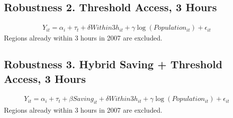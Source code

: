 \documentclass[a4paper, 10pt]{article}
\begin{document}
\begin{table}[H]
\centering
\caption{Robustness 3. Hybrid Saving + Threshold Access, 2.5 Hours: 의사}

\end{table}

\subsection{Robustness 2. Threshold Access, 3 Hours}
\begin{align*}
    Y_{it}=\alpha_i+\tau_t+\delta Within3h_{it}+\gamma\log(Population_{it})+\epsilon_{it}
\end{align*}
Regions already within 3 hours in 2007 are excluded.
\begin{table}[H]
\centering
\caption{Robustness 2. Threshold Access, 3 Hours: 의원}

\end{table}

\begin{table}[H]
\centering
\caption{Robustness 2. Threshold Access, 3 Hours: 병원}

\end{table}

\begin{table}[H]
\centering
\caption{Robustness 2. Threshold Access, 3 Hours: 종합병원}

\end{table}

\begin{table}[H]
\centering
\caption{Robustness 2. Threshold Access, 3 Hours: 상급종합병원}

\end{table}

\begin{table}[H]
\centering
\caption{Robustness 2. Threshold Access, 3 Hours: 의사}

\end{table}

\subsection{Robustness 3. Hybrid Saving + Threshold Access, 3 Hours}
\begin{align*}
    Y_{it}=\alpha_i+\tau_t+\beta Saving_{it}+\delta Within3h_{it}+\gamma\log(Population_{it})+\epsilon_{it}
\end{align*}
Regions already within 3 hours in 2007 are excluded.
\begin{table}[H]
\centering
\caption{Robustness 3. Hybrid Saving + Threshold Access, 3 Hours: 의원}

\end{table}
\end{document}
